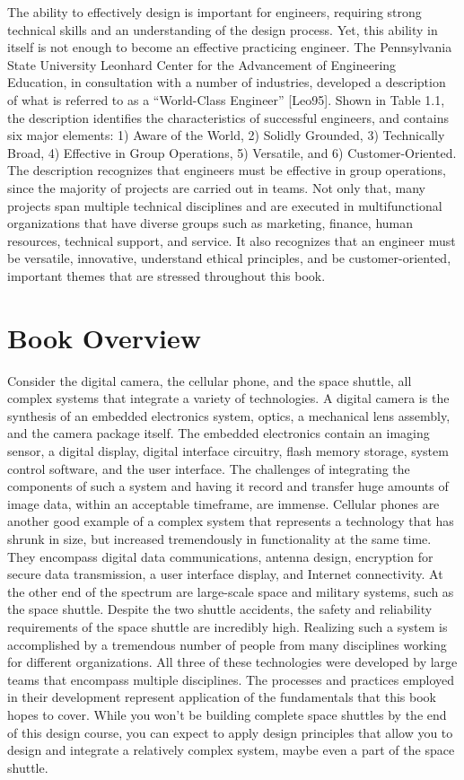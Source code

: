 The ability to effectively design is important for engineers, requiring
strong technical skills and an understanding of the design process. Yet,
this ability in itself is not enough to become an effective practicing
engineer. The Pennsylvania State University Leonhard Center for the
Advancement of Engineering Education, in consultation with a number of
industries, developed a description of what is referred to as a
``World-Class Engineer'' {[}Leo95{]}. Shown in Table 1.1, the
description identifies the characteristics of successful engineers, and
contains six major elements: 1) Aware of the World, 2) Solidly Grounded,
3) Technically Broad, 4) Effective in Group Operations, 5) Versatile,
and 6) Customer-Oriented. The description recognizes that engineers must
be effective in group operations, since the majority of projects are
carried out in teams. Not only that, many projects span multiple
technical disciplines and are executed in multifunctional organizations
that have diverse groups such as marketing, finance, human resources,
technical support, and service. It also recognizes that an engineer must
be versatile, innovative, understand ethical principles, and be
customer-oriented, important themes that are stressed throughout this
book.

\section{Book Overview}\label{book-overview}

Consider the digital camera, the cellular phone, and the space shuttle,
all complex systems that integrate a variety of technologies. A digital
camera is the synthesis of an embedded electronics system, optics, a
mechanical lens assembly, and the camera package itself. The embedded
electronics contain an imaging sensor, a digital display, digital
interface circuitry, flash memory storage, system control software, and
the user interface. The challenges of integrating the components of such
a system and having it record and transfer huge amounts of image data,
within an acceptable timeframe, are immense. Cellular phones are another
good example of a complex system that represents a technology that has
shrunk in size, but increased tremendously in functionality at the same
time. They encompass digital data communications, antenna design,
encryption for secure data transmission, a user interface display, and
Internet connectivity. At the other end of the spectrum are large-scale
space and military systems, such as the space shuttle. Despite the two
shuttle accidents, the safety and reliability requirements of the space
shuttle are incredibly high. Realizing such a system is accomplished by
a tremendous number of people from many disciplines working for
different organizations. All three of these technologies were developed
by large teams that encompass multiple disciplines. The processes and
practices employed in their development represent application of the
fundamentals that this book hopes to cover. While you won't be building
complete space shuttles by the end of this design course, you can expect
to apply design principles that allow you to design and integrate a
relatively complex system, maybe even a part of the space shuttle.

